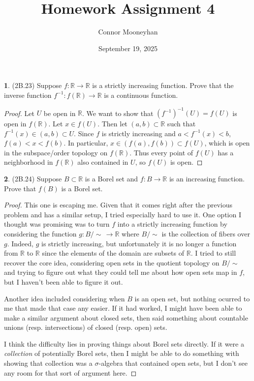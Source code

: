 \documentclass[12pt]{article}
\title{Homework Assignment 4}
\author{Connor Mooneyhan}
\date{September 19, 2025}
\theoremstyle{definition}
\newtheorem{ex}{}
\begin{document}
\maketitle

\begin{ex}
	(2B.23)
	Suppose $f: \mathbb{R} \to \mathbb{R}$ is a strictly increasing function.
	Prove that the inverse function $f^{-1} : f(\mathbb{R}) \to \mathbb{R}$ is a continuous function.
\end{ex}
\begin{proof}
	Let $U$ be open in $\mathbb{R}$.
	We want to show that $(f^{-1})^{-1}(U) = f(U)$ is open in $f(\mathbb{R})$.
	Let $x \in f(U)$.
	Then let $(a, b) \subset \mathbb{R}$ such that $f^{-1}(x) \in (a, b) \subset U$.
	Since $f$ is strictly increasing and $a < f^{-1}(x) < b$, $f(a) < x < f(b)$.
	In particular, $x \in (f(a), f(b)) \subset f(U)$, which is open in the subspace/order topology on $f(\mathbb{R})$.
	Thus every point of $f(U)$ has a neighborhood in $f(\mathbb{R})$ also contained in $U$, so $f(U)$ is open.
\end{proof}

\begin{ex}
	(2B.24)
	Suppose $B \subset \mathbb{R}$ is a Borel set and $f: B \to \mathbb{R}$ is an increasing function.
	Prove that $f(B)$ is a Borel set.
\end{ex}
\begin{proof}
  This one is escaping me.
  Given that it comes right after the previous problem and has a similar setup, I tried especially hard to use it.
  One option I thought was promising was to turn $f$ into a strictly increasing function by considering the function $g : B/\sim \,\to \mathbb{R}$ where $B/\sim$ is the collection of fibers over $g$.
  Indeed, $g$ is strictly increasing, but unfortunately it is no longer a function from $\mathbb{R}$ to $\mathbb{R}$ since the elements of the domain are subsets of $\mathbb{R}$.
  I tried to still recover the core idea, considering open sets in the quotient topology on $B/\sim$ and trying to figure out what they could tell me about how open sets map in $f$, but I haven't been able to figure it out.

  Another idea included considering when $B$ is an open set, but nothing ocurred to me that made that case any easier.
  If it had worked, I might have been able to make a similar argument about closed sets, then said something about countable unions (resp. intersections) of closed (resp. open) sets.

  I think the difficulty lies in proving things about Borel sets directly.
  If it were a \textit{collection} of potentially Borel sets, then I might be able to do something with showing that collection was a $\sigma$-algebra that contained open sets, but I don't see any room for that sort of argument here.
\end{proof}
\end{document}

